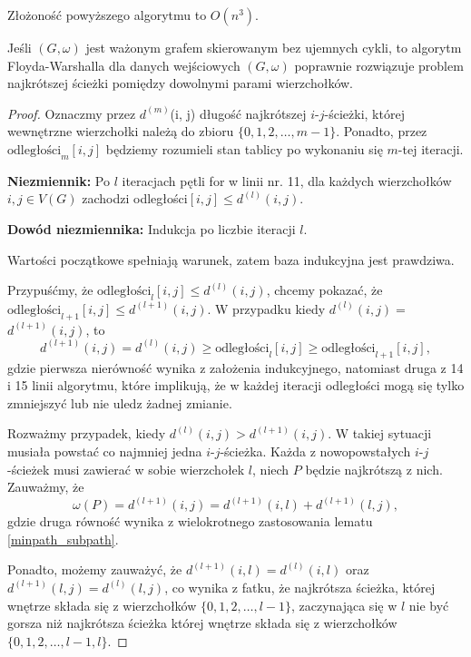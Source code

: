 Złożoność powyższego algorytmu to $O(n^3)$.

\begin{theorem}
	Jeśli $(G, \omega)$ jest ważonym grafem skierowanym
	bez ujemnych cykli, to algorytm Floyda-Warshalla dla 
	danych wejściowych $(G, \omega)$ poprawnie
	rozwiązuje problem najkrótszej ścieżki 
	pomiędzy dowolnymi parami wierzchołków.
	
	\begin{proof}
		Oznaczmy przez $d^{(m)}$(i, j) długość najkrótszej
		$i$-$j$-ścieżki, której wewnętrzne wierzchołki 
		należą do zbioru $\{0, 1, 2, \dots, m-1\}$. 
		Ponadto, przez
		$\text{odległości}_{m}[i, j]$ będziemy rozumieli 
		stan tablicy po 
		wykonaniu się $m$-tej iteracji.
		
		\textbf{Niezmiennik:} Po $l$ iteracjach 
		pętli for w linii nr. 11, dla każdych wierzchołków
		$i, j \in V(G)$ zachodzi odległości$[i,j] \leq d^{(l)}(i,j)$.
		
		\textbf{Dowód niezmiennika:} Indukcja po liczbie iteracji $l$.
		
		Wartości początkowe spełniają warunek, zatem
		baza indukcyjna jest prawdziwa. 
		
		Przypuśćmy, że $\text{odległości}_{l}[i, j] \leq
		d^{(l)}(i, j)$, chcemy pokazać, że 
		$\text{odległości}_{l+1}[i, j] \leq$$ d^{(l+1)}(i, j)$.
		W przypadku kiedy $d^{(l)}(i,j) =$$ d^{(l+1)}(i,j)$, to
		\[d^{(l+1)}(i,j) = d^{(l)}(i, j) \geq 
		\text{odległości}_l[i, j] \geq \text{odległości}_{l+1}[i, j],\]
		gdzie pierwsza nierówność wynika z założenia indukcyjnego, natomiast
		druga z 14 i 15 linii algorytmu, które implikują, że
		w każdej iteracji odległości mogą się tylko zmniejszyć lub
		nie uledz żadnej zmianie.
		
		Rozważmy przypadek, kiedy $d^{(l)}(i,j) >$$ d^{(l+1)}(i,j)$. 
		W takiej sytuacji musiała powstać co najmniej jedna 
		$i$-$j$-ścieżka. Każda z nowopowstałych $i$-$j$-ścieżek
		musi zawierać w sobie wierzchołek $l$, niech 
		$P$ będzie najkrótszą z nich. Zauważmy, że
		\[\omega(P) = d^{(l+1)}(i, j) = 
		d^{(l+1)}(i, l) + d^{(l+1)}(l, j),\]
		gdzie druga równość wynika z wielokrotnego zastosowania 
		lematu \ref{minpath_subpath}.
		
		Ponadto, możemy zauważyć, że $d^{(l+1)}(i, l) = d^{(l)}(i, l)$ 
		oraz $d^{(l+1)}(l, j) = d^{(l)}(l, j)$, co wynika z fatku, że
		najkrótsza ścieżka, której wnętrze składa się z wierzchołków 
		$\{0, 1, 2, \dots, l-1\}$, zaczynająca się w $l$ 
		nie być gorsza niż najkrótsza ścieżka której 
		wnętrze składa się z wierzchołków 
		$\{0, 1, 2, \dots, l-1, l\}$.
		

\end{proof}
\end{theorem}
